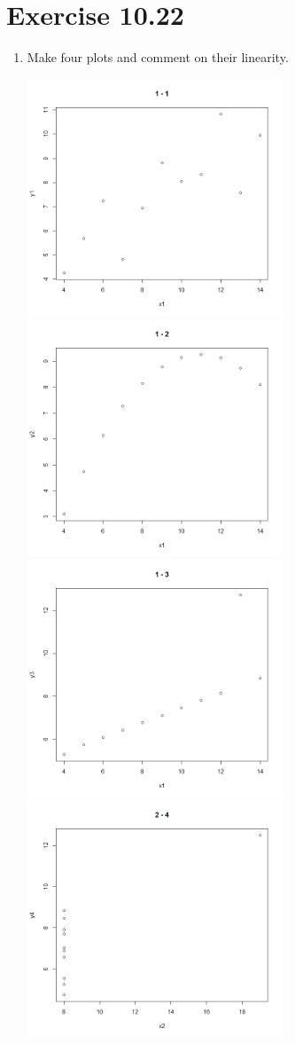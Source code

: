 \documentclass{article}
\begin{document}
\section*{Exercise 10.22}

\begin{enumerate}[\quad(a)]
	\item Make four plots and comment on their linearity.
	\begin{center}
		\includegraphics[width=3in]{Q61.png}\includegraphics[width=3in]{Q62.png}
		\includegraphics[width=3in]{Q63.png}\includegraphics[width=3in]{Q64.png}

\end{center}
\end{enumerate}
\end{document}
